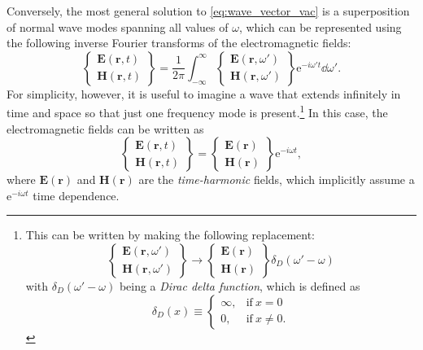 Conversely, the most general solution to \cref{eq:wave_vector_vac} is a superposition of normal wave modes spanning all values of $\omega$, which can be represented using the following inverse Fourier transforms of the electromagnetic fields:
\begin{equation}
 \left\{
 \begin{array}{lr}
 \mathbold{E} \left( \mathbold{r} , t \right) \\
 \mathbold{H} \left( \mathbold{r} , t \right)
 \end{array}
 \right\} = \frac{1}{2 \pi} \int_{-\infty}^{\infty} \left\{
 \begin{array}{lr}
 \mathbold{E} \left( \mathbold{r} , \omega ' \right) \\
 \mathbold{H} \left( \mathbold{r} , \omega ' \right)
 \end{array}
 \right\} \mathrm{e}^{-i \omega ' t} \dd{\omega} ' . 
 \end{equation} 
For simplicity, however, it is useful to imagine a wave that extends infinitely in time and space so that just one frequency mode is present.\footnote{This can be written by making the following replacement:
\begin{equation*}
 \left\{
 \begin{array}{lr}
 \mathbold{E} \left( \mathbold{r} , \omega ' \right) \\
 \mathbold{H} \left( \mathbold{r} , \omega ' \right)
 \end{array} 
 \right\} \to \left\{
 \begin{array}{lr}
 \mathbold{E} \left( \mathbold{r} \right) \\
 \mathbold{H} \left( \mathbold{r} \right)
 \end{array} 
 \right\} \delta_D \left( \omega ' - \omega \right) 
 \end{equation*} 
with $\delta_D (\omega ' - \omega)$ being a \emph{Dirac delta function}, which is defined as \begin{equation*}
\delta_D \left( x \right) \equiv
   \begin{cases}
     \infty, & \text{if}\ x = 0 \\
     0, & \text{if}\ x \neq 0 .
   \end{cases} 
\end{equation*}
\label{footnote:dirac_delta}}  %
In this case, the electromagnetic fields can be written as 
\begin{equation}\label{eq:single-mode}
 \left\{
 \begin{array}{lr}
 \mathbold{E} \left( \mathbold{r} , t \right) \\
 \mathbold{H} \left( \mathbold{r} , t \right)
 \end{array} 
 \right\} =  \left\{
 \begin{array}{lr}
 \mathbold{E} \left( \mathbold{r} \right) \\
 \mathbold{H} \left( \mathbold{r} \right)
 \end{array} 
 \right\} \mathrm{e}^{-i \omega t} , 
 \end{equation} 
where $\mathbold{E}(\mathbold{r})$ and $\mathbold{H}(\mathbold{r})$ are the \emph{time-harmonic} fields, which implicitly assume a $\mathrm{e}^{-i \omega t}$ time dependence. 

